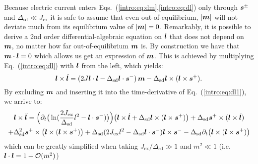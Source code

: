 Because electric current enters Eqs.~(\ref{intro:eq:dm},\ref{intro:eq:dl}) only through $\boldsymbol{s}^\pm$ and $\Delta_\text{sd}\ll J_\text{ex}$ it is safe to assume that even out-of-equilibrium, $|\boldsymbol{m}|$ will not deviate much from its equilibrium value of $|\boldsymbol{m}|=0$. Remarkably, it is possible to derive a 2nd order differential-algebraic equation on $\boldsymbol{l}$ that does not depend on $\boldsymbol{m}$, no matter how far out-of-equilibrium $\boldsymbol{m}$ is. By construction we have that  $\boldsymbol{m}\cdot\boldsymbol{l}=0$ which allows us get an expression of $\boldsymbol{m}$. This is achieved by multiplying Eq.~(\ref{intro:eq:dl}) with $\boldsymbol{l}$ from the left, which yields:
\begin{equation}
    \boldsymbol{l}\times\dot{\boldsymbol{l}}=(2J \boldsymbol{l}\cdot\boldsymbol{l}-\Delta_\text{sd}\boldsymbol{l}\cdot\boldsymbol{s}^-)\,\boldsymbol{m}-\Delta_\text{sd}\boldsymbol{l}\times(\boldsymbol{l}\times\boldsymbol{s}^+).\label{intro:eq:dl1}
\end{equation}
By excluding $\boldsymbol{m}$ and inserting it into the time-derivative of Eq.~(\ref{intro:eq:dl1}), we arrive to:
\begin{multline}
        \boldsymbol{l}\times\ddot{\boldsymbol{l}}=
        \Big(\partial_t\big(\mathop{\mathrm{ln}}\nolimits(\frac{2J_\text{ex}}{\Delta_\text{sd}}l^2-\boldsymbol{l}\cdot\boldsymbol{s}^-)\big)\Big)\big(\boldsymbol{l}\times\dot{\boldsymbol{l}}+\Delta_\text{sd}\boldsymbol{l}\times(\boldsymbol{l}\times\boldsymbol{s}^+)\big)
        + \Delta_\text{sd}\boldsymbol{s}^+\times(\boldsymbol{l}\times\dot{\boldsymbol{l}})\\
        + \Delta_\text{sd}^2\boldsymbol{s}^+\times\big(\boldsymbol{l}\times(\boldsymbol{l}\times\boldsymbol{s}^+)\big)
        + \Delta_\text{sd}(2J_\text{ex} l^2-\Delta_\text{sd}\boldsymbol{l}\cdot\boldsymbol{s}^-)\boldsymbol{l}\times\boldsymbol{s}^-
        -\Delta_\text{sd}\partial_t \big(\boldsymbol{l}\times(\boldsymbol{l}\times\boldsymbol{s}^+)\big)
\end{multline}
which can be greatly simplified when taking $J_\text{ex}/\Delta_\text{sd}\gg1$ and $m^2\ll1$ (i.e. $\boldsymbol{l}\cdot\boldsymbol{l}=1+\mathcal{O}(m^2)$)
